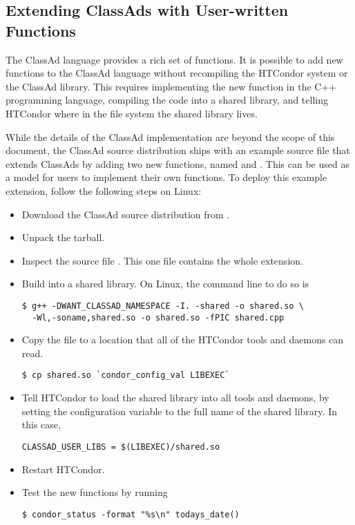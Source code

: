 \subsection{\label{sec:classad-userfunctions}
Extending ClassAds with User-written Functions}

The ClassAd language provides a rich set of functions.  It is possible
to add new functions to the ClassAd language without recompiling
the HTCondor system or the ClassAd library.  
This requires implementing the
new function in the C++ programming language, 
compiling the code into a shared library, 
and telling HTCondor where in the file system the shared library lives.

While the details of the ClassAd implementation are beyond the scope of 
this document,
the ClassAd source distribution ships with an example source file that 
extends ClassAds by adding two new functions,
named  and .  
This can be used as a model for users to implement
their own functions. 
To deploy this example extension, follow the following steps on Linux:

\begin{itemize}
\item{Download the ClassAd source distribution from 
.}
\item{Unpack the tarball.}
\item{Inspect the source file .
This one file contains the whole extension.}
\item{Build  into a shared library.  
On Linux, the command line to do so is
\begin{verbatim}
$ g++ -DWANT_CLASSAD_NAMESPACE -I. -shared -o shared.so \
  -Wl,-soname,shared.so -o shared.so -fPIC shared.cpp
\end{verbatim}
}
\item{Copy the file  to a location that all of 
the HTCondor tools and daemons can read.
\begin{verbatim}
$ cp shared.so `condor_config_val LIBEXEC`
\end{verbatim}
}
\item{Tell HTCondor to load the shared library into all tools and daemons, 
by setting the \Macro{CLASSAD\_USER\_LIBS} configuration variable
 to the full name of the shared library.  In this case,
\begin{verbatim}
CLASSAD_USER_LIBS = $(LIBEXEC)/shared.so
\end{verbatim}
}
\item{Restart HTCondor.}
\item{Test the new functions by running
\begin{verbatim}
$ condor_status -format "%s\n" todays_date()
\end{verbatim}
}

\end{itemize}

